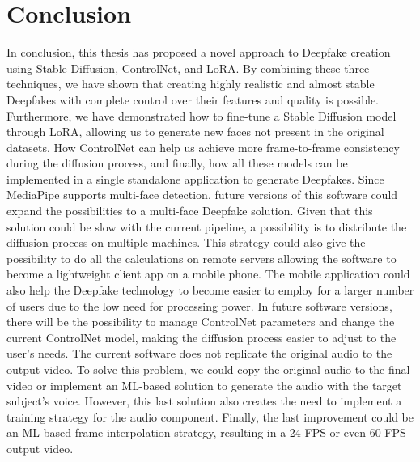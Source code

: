 \documentclass[preprint]{elsarticle}
\begin{document}
\section{Conclusion}\label{ch:conclusion}
In conclusion, this thesis has proposed a novel approach to Deepfake creation using Stable Diffusion, ControlNet, and LoRA. By combining these three techniques, we have shown that creating highly realistic and almost stable Deepfakes with complete control over their features and quality is possible. Furthermore, we have demonstrated how to fine-tune a Stable Diffusion model through LoRA,  allowing us to generate new faces not present in the original datasets. How ControlNet can help us achieve more frame-to-frame consistency during the diffusion process, and finally, how all these models can be implemented in a single standalone application to generate Deepfakes. Since MediaPipe supports multi-face detection, future versions of this software could expand the possibilities to a multi-face Deepfake solution. Given that this solution could be slow with the current pipeline, a possibility is to distribute the diffusion process on multiple machines. This strategy could also give the possibility to do all the calculations on remote servers allowing the software to become a lightweight client app on a mobile phone. The mobile application could also help the Deepfake technology to become easier to employ for a larger number of users due to the low need for processing power. In future software versions, there will be the possibility to manage ControlNet parameters and change the current ControlNet model, making the diffusion process easier to adjust to the user's needs.
The current software does not replicate the original audio to the output video. To solve this problem, we could copy the original audio to the final video or implement an ML-based solution to generate the audio with the target subject's voice. However, this last solution also creates the need to implement a training strategy for the audio component. Finally, the last improvement could be an ML-based frame interpolation strategy, resulting in a 24 FPS or even 60 FPS output video.

  

\end{document}
